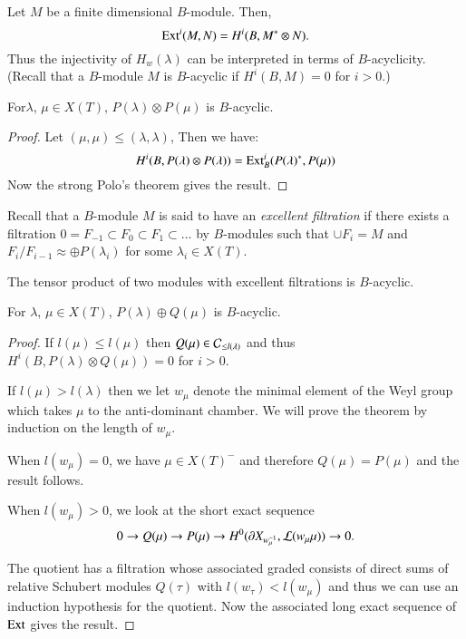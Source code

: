Let $M$ be a finite dimensional $B$-module. Then,
$$
\operatorname{Ext}^{i}(M,N)=H^{i}(B,M^{*}\otimes N). 
$$
Thus the injectivity of
$H_{w}(\lambda)$ can be interpreted in terms of
$B$-acyclicity. (Recall that a $B$-module $M$ is 
$B$-acyclic if
$H^{i}(B,M)=0$ for $i>0$.)

\begin{corollary}\label{chap3-coro3.2.4}
For\pageoriginale $\lambda$,\label{page29} $\mu\in X(T)$, $P(\lambda)\otimes P(\mu)$
is $B$-acyclic.
\end{corollary}

\begin{proof}
Let $(\mu,\mu)\leq (\lambda,\lambda)$, Then we have:
$$
H^{i}(B,P(\lambda)\otimes
P(\lambda))=\operatorname{Ext}^{i}_{B}(P(\lambda)^{*},P(\mu))
$$
Now the strong Polo's theorem gives the result.
\end{proof}

Recall that a $B$-module $M$ is said to have an {\em excellent
  filtration} if there exists a filtration $0=F_{-1}\subset
F_{0}\subset F_{1}\subset \ldots$ by $B$-modules such that $\cup
F_{i}=M$ and $F_{i}/F_{i-1}\approx \oplus P(\lambda_{i})$ for some
$\lambda_{i}\in X(T)$.

\begin{corollary}\label{chap3-coro3.2.5}
The tensor product of two modules with excellent filtrations is
$B$-acyclic. 
\end{corollary}

\begin{theorem}\label{chap3-thm3.2.6}
For $\lambda$, $\mu\in X(T)$, $P(\lambda)\oplus Q(\mu)$ is $B$-acyclic.
\end{theorem}

\begin{proof}
If $l(\mu)\leq l(\mu)$ then $Q(\mu)\in \mathcal{C}_{\leq l(\lambda)}$ and thus
$H^{i}(B,P(\lambda)\otimes Q(\mu))=0$ for $i>0$.

If $l(\mu)>l(\lambda)$ then we let $w_{\mu}$ denote the minimal
element of the Weyl group which takes $\mu$ to the anti-dominant
chamber. We will prove the theorem by induction on the length of
$w_{\mu}$. 

When $l(w_{\mu})=0$, we have $\mu\in X(T)^{-}$ and therefore
$Q(\mu)=P(\mu)$ and the result follows.

When $l(w_{\mu})>0$, we look at the short exact sequence
$$
0\to Q(\mu)\to P(\mu)\to H^{0}(\partial X_{w_{\mu}^{-1}}, \mathcal{L}(w_{\mu}\mu))\to
0.
$$

The quotient has a filtration whose associated graded consists of
direct sums of relative Schubert modules $Q(\tau)$ with
$l(w_{\tau})<l(w_{\mu})$ and thus we can use an induction hypothesis
for the quotient. Now the associated long exact sequence of $\operatorname{Ext}$
gives the result.
\end{proof}

